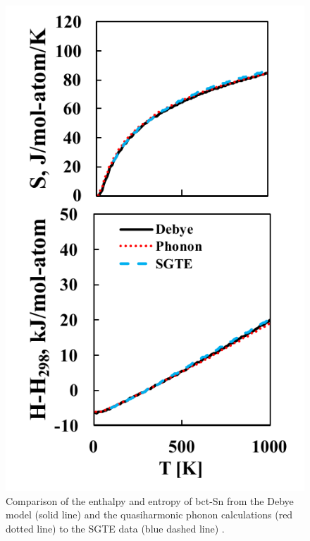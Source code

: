 \pagebreak
\begin{figure}[H]
	\centering
	\includegraphics[scale=1.0]{Chapter-4/Figures/Snfinitetemp.pdf}
	\caption{Comparison of the enthalpy and entropy of bct-Sn from the Debye model (solid line) and the quasiharmonic phonon calculations (red dotted line) to the SGTE data (blue dashed line) \cite{Dinsdale1991}.}
	\label{Ch4-figure:Snfinitetemp}
\end{figure}

